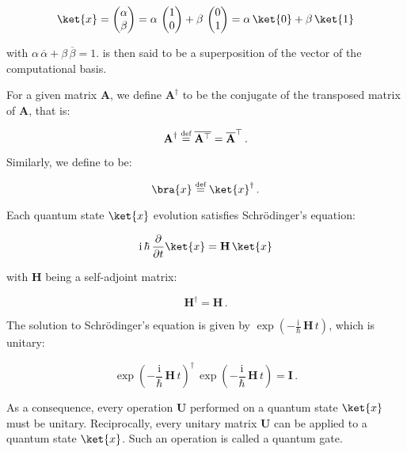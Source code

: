 \documentclass[11pt, a4paper]{article}
\begin{document}
                \[\ket{x} = \begin{pmatrix}\alpha\\\beta\end{pmatrix}=\alpha\,\begin{pmatrix}1\\0\end{pmatrix} + \beta\,\begin{pmatrix}0\\1\end{pmatrix}=\alpha\,\ket{0} + \beta\,\ket{1}\]
                
                with \(\alpha\,\overline{\alpha} + \beta\,\overline{\beta} = 1\).  is then said to be a superposition of the vector of the computational basis.
                
                For a given matrix \(\mathbf{A}\), we define \(\mathbf{A}^\dagger\) to be the conjugate of the transposed matrix of \(\mathbf{A}\), that is:
                
                \[\mathbf{A}^\dagger \overset{\text{\tiny{def}}}{=} \overline{\mathbf{A}^\top} = \overline{\mathbf{A}}^\top\,.\]
                
                Similarly, we define  to be:
                
                \[\bra{x}\overset{\text{\tiny{def}}}{=}\ket{x}^\dagger\,.\]
                
                Each quantum state \(\ket{x}\) evolution satisfies Schrödinger's equation:
                
                \[\mathrm{i}\,\hbar\,\frac{\partial}{\partial t}\ket{x} = \mathbf{H}\,\ket{x}\]
                
                with \(\mathbf{H}\) being a self-adjoint matrix:
                
                \[\mathbf{H}^\dagger=\mathbf{H}\,.\]
                
                The solution to Schrödinger's equation is given by \(\exp\left(-\frac{\mathrm{i}}{\hbar}\,\mathbf{H}\,t\right)\), which is unitary:
                
                \[\exp\left(-\frac{\mathrm{i}}{\hbar}\,\mathbf{H}\,t\right)^\dagger\,\exp\left(-\frac{\mathrm{i}}{\hbar}\,\mathbf{H}\,t\right) = \mathbf{I}\,.\]
                
                As a consequence, every operation \(\mathbf{U}\) performed on a quantum state \(\ket{x}\) must be unitary. Reciprocally, every unitary matrix \(\mathbf{U}\) can be applied to a quantum state \(\ket{x}\). Such an operation is called a quantum gate. 
                
\end{document}
